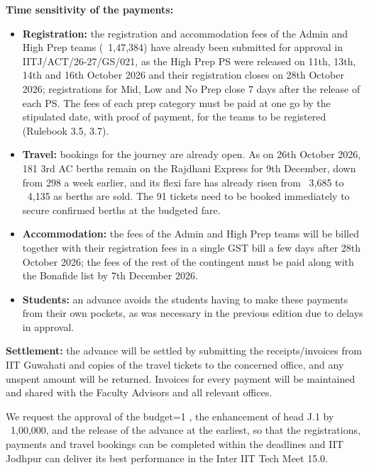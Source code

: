 \documentclass[11pt,letterpaper]{article}
\newcommand{\rs}{{\rupee}}
\providecommand{\increasevariant}{0}
\newcommand{\ifincrease}[2]{\ifnum\increasevariant=1 #1\else #2\fi}
\begin{document}
\textbf{Time sensitivity of the payments:}
\begin{itemize}
  \item \textbf{Registration:} the registration and accommodation fees of the Admin and High Prep teams (\rs~1,47,384) have already been submitted for approval in IITJ/ACT/26-27/GS/021, as the High Prep PS were released on 11th, 13th, 14th and 16th October 2026 and their registration closes on 28th October 2026; registrations for Mid, Low and No Prep close 7 days after the release of each PS. The fees of each prep category must be paid at one go by the stipulated date, with proof of payment, for the teams to be registered (Rulebook 3.5, 3.7).
  \item \textbf{Travel:} bookings for the journey are already open. As on 26th October 2026, 181 3rd AC berths remain on the Rajdhani Express for 9th December, down from 298 a week earlier, and its flexi fare has already risen from \rs~3,685 to \rs~4,135 as berths are sold. The 91 tickets need to be booked immediately to secure confirmed berths at the budgeted fare.
  \item \textbf{Accommodation:} the fees of the Admin and High Prep teams will be billed together with their registration fees in a single GST bill a few days after 28th October 2026; the fees of the rest of the contingent must be paid along with the Bonafide list by 7th December 2026.
  \item \textbf{Students:} an advance avoids the students having to make these payments from their own pockets, as was necessary in the previous edition due to delays in approval.
\end{itemize}

\textbf{Settlement:} the advance will be settled by submitting the receipts/invoices from IIT Guwahati and copies of the travel tickets to the concerned office, and any unspent amount will be returned. Invoices for every payment will be maintained and shared with the Faculty Advisors and all relevant offices.

We request the approval of the budget\ifincrease{, the enhancement of head J.1 by \rs~1,00,000}{}, and the release of the advance at the earliest, so that the registrations, payments and travel bookings can be completed within the deadlines and IIT Jodhpur can deliver its best performance in the Inter IIT Tech Meet 15.0.
\end{document}
